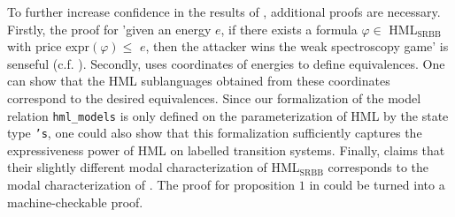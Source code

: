 To further increase confidence in the results of \cite{bisping2023lineartimebranchingtime}, additional proofs are necessary. Firstly, the proof for 'given an energy $e$, if there exists a formula $\varphi \in$ HML$_\text{SRBB}$ with price expr$(\varphi) \leq$ $e$, then the attacker wins the weak spectroscopy game' is senseful (c.f. \cite[lemma $1$]{bisping2023lineartimebranchingtime}).
Secondly, \cite{bisping2023lineartimebranchingtime} uses coordinates of energies to define equivalences. One can show that the HML sublanguages obtained from these coordinates correspond to the desired equivalences.
Since our formalization of the model relation \texttt{hml\_models} is only defined on the parameterization of HML by the state type \texttt{'s}, one could also show that this formalization sufficiently captures the expressiveness power of HML on labelled transition systems.
Finally, \cite[proposition 1]{bisping2023lineartimebranchingtime} claims that their slightly different modal characterization of HML$_\text{SRBB}$ corresponds to the modal characterization of \cite{FOKKINK2019104435}. 
The proof for proposition $1$ in \cite{bisping2023lineartimebranchingtime} could be turned into a machine-checkable proof. 